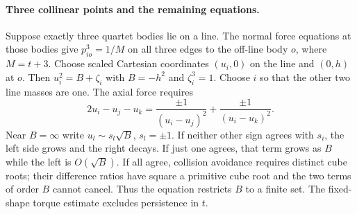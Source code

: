 \documentclass[11pt]{article}
\begin{document}
\paragraph{Three collinear points and the remaining equations.}
Suppose exactly three quartet bodies lie on a line. The normal force equations at those bodies give $p_{io}^3=1/M$ on all three edges to the off-line body $o$, where $M=t+3$. Choose scaled Cartesian coordinates $(u_i,0)$ on the line and $(0,h)$ at $o$. Then $u_i^2=B+\zeta_i$ with $B=-h^2$ and $\zeta_i^3=1$. Choose $i$ so that the other two line masses are one. The axial force requires
\[
 2u_i-u_j-u_k=\frac{\pm1}{(u_i-u_j)^2}+\frac{\pm1}{(u_i-u_k)^2}.
\]
Near $B=\infty$ write $u_l\sim s_l\sqrt B$, $s_l=\pm1$. If neither other sign agrees with $s_i$, the left side grows and the right decays. If just one agrees, that term grows as $B$ while the left is $O(\sqrt B)$. If all agree, collision avoidance requires distinct cube roots; their difference ratios have square a primitive cube root and the two terms of order $B$ cannot cancel. Thus the equation restricts $B$ to a finite set. The fixed-shape torque estimate excludes persistence in $t$.
\end{document}
